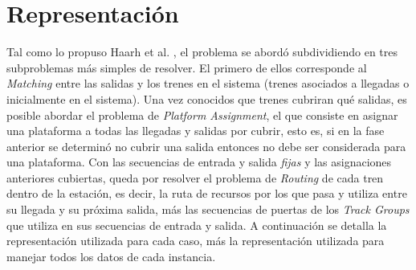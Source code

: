 \documentclass[letter, 10pt]{article}
\begin{document}
\section{Representación}

Tal como lo propuso Haarh et al. \cite{MathHeuristic}, el problema se abordó subdividiendo en tres subproblemas más simples de resolver. El primero de ellos corresponde al \textit{Matching} entre las salidas y los trenes en el sistema (trenes asociados a llegadas o inicialmente en el sistema). Una vez conocidos que trenes cubriran qué salidas, es posible abordar el problema de \textit{Platform Assignment}, el que consiste en asignar una plataforma a todas las llegadas y salidas por cubrir, esto es, si en la fase anterior se determinó no cubrir una salida entonces no debe ser considerada para una plataforma. Con las secuencias de entrada y salida \textit{fijas} y las asignaciones anteriores cubiertas, queda por resolver el problema de \textit{Routing} de cada tren dentro de la estación, es decir, la ruta de recursos por los que pasa y utiliza entre su llegada y su próxima salida, más las secuencias de puertas de los \textit{Track Groups} que utiliza en sus secuencias de entrada y salida. A continuación se detalla la representación utilizada para cada caso, más la representación utilizada para manejar todos los datos de cada instancia.
\end{document}
